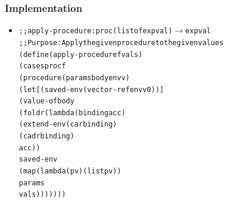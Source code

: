 \documentclass{beamer}
\newcommand{\arrow}{\(\rightarrow\)}
\begin{document}
\begin{frame}[fragile]
\frametitle{Implementation}
\begin{scriptsize}
\begin{itemize}
\item<1->
\begin{alltt}
;; apply-procedure : proc (listof expval) \arrow{} expval
;; Purpose: Apply the given procedure to the given values
(define (apply-procedure f vals)
  (cases proc f
    (procedure (params body envv)
      (let [(saved-env (vector-ref envv 0))]
        (value-of body
                  (foldr (lambda (binding acc)
                    (extend-env (car binding)
                                (cadr binding)
                                acc))
                    saved-env
                    (map (lambda (p v) (list p v))
                         params
                         vals)))))))
\end{alltt}
\end{itemize}
\end{scriptsize}
\end{frame}
\end{document}
